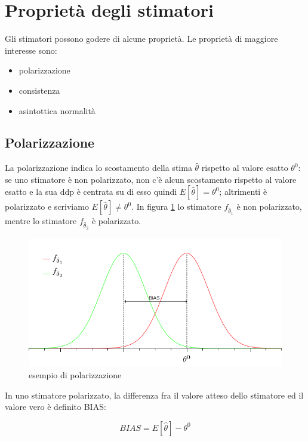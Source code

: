 \section{Proprietà degli stimatori}
Gli stimatori possono godere di alcune proprietà. Le proprietà di maggiore interesse sono:
  \begin{itemize}
     \item polarizzazione
     \item consistenza
     \item asintottica normalità
   \end{itemize}
\subsection{Polarizzazione}
La polarizzazione  indica lo scostamento della stima $\hat{\theta}$ rispetto al valore esatto $\theta^0$: se uno stimatore è non polarizzato, non c'è alcun scostamento rispetto al valore esatto e la sua ddp è centrata su di esso quindi $E[\hat{\theta}]=\theta^0$; altrimenti è polarizzato e scriviamo $E[\hat{\theta}]\ne \theta^0$. In figura \ref{fig:espolarizzazione} lo stimatore $f_{\hat{\theta}_1}$ è non polarizzato, mentre lo stimatore $f_{\hat{\theta}_2}$ è polarizzato. 

  \begin{figure}[htbp]
    \centering
    \includegraphics[scale=0.6]{img/polarizzazione.png}
    \caption{esempio di polarizzazione\label{fig:espolarizzazione}}
  \end{figure}

In uno stimatore polarizzato, la differenza fra il valore atteso dello stimatore ed il valore vero è definito BIAS:

    \[ BIAS=E[\hat{\theta}]-\theta^0 \]

